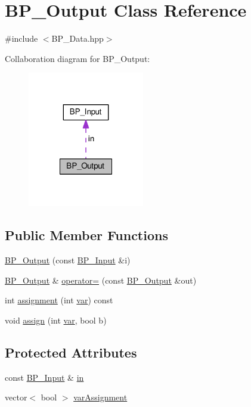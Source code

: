 \hypertarget{class_b_p___output}{\section{B\-P\-\_\-\-Output Class Reference}
\label{class_b_p___output}
}


{\ttfamily \#include $<$B\-P\-\_\-\-Data.\-hpp$>$}



Collaboration diagram for B\-P\-\_\-\-Output\-:\nopagebreak
\begin{figure}[H]
\begin{center}
\leavevmode
\includegraphics[width=144pt]{class_b_p___output__coll__graph}
\end{center}
\end{figure}
\subsection*{Public Member Functions}
\begin{DoxyCompactItemize}
\item 
\hyperlink{class_b_p___output_a1b18890b45b21a2986a489a8699891e9}{B\-P\-\_\-\-Output} (const \hyperlink{class_b_p___input}{B\-P\-\_\-\-Input} \&i)
\item 
\hyperlink{class_b_p___output}{B\-P\-\_\-\-Output} \& \hyperlink{class_b_p___output_a5885aba4ce5e63e08a7ccac9d2a409ed}{operator=} (const \hyperlink{class_b_p___output}{B\-P\-\_\-\-Output} \&out)
\item 
int \hyperlink{class_b_p___output_ab04e487bb643ea365287b5b1e86b6197}{assignment} (int \hyperlink{structvar}{var}) const 
\item 
void \hyperlink{class_b_p___output_afffa35963a12e9175a680eb14949e642}{assign} (int \hyperlink{structvar}{var}, bool b)
\end{DoxyCompactItemize}
\subsection*{Protected Attributes}
\begin{DoxyCompactItemize}
\item 
const \hyperlink{class_b_p___input}{B\-P\-\_\-\-Input} \& \hyperlink{class_b_p___output_a84649c3f9e29b7fdf080419ff590c096}{in}
\item 
vector$<$ bool $>$ \hyperlink{class_b_p___output_a581b177c0383ee72b0395595641fb82b}{var\-Assignment}
\end{DoxyCompactItemize}
